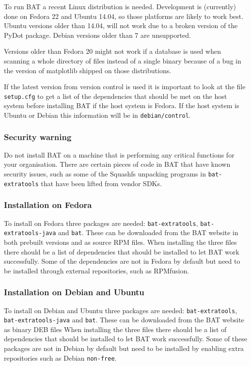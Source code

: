 \documentclass[10pt,a4paper]{article}
\begin{document}
To run BAT a recent Linux distribution is needed. Development is (currently)
done on Fedora 22 and Ubuntu 14.04, so those platforms are likely to
work best. Ubuntu versions older than 14.04, will not work due to a broken
version of the PyDot package. Debian versions older than 7 are unsupported.

Versions older than Fedora 20 might not work if a database is used when
scanning a whole directory of files instead of a single binary because of a bug
in the version of matplotlib shipped on those distributions.

If the latest version from version control is used it is important to look at
the file \texttt{setup.cfg} to get a list of the dependencies that should be
met on the host system before installing BAT if the host system is Fedora. If
the host system is Ubuntu or Debian this information will be in
\texttt{debian/control}.

\subsubsection{Security warning}

Do not install BAT on a machine that is performing any critical functions for
your organisation. There are certain pieces of code in BAT that have known
security issues, such as some of the Squashfs unpacking programs in
\texttt{bat-extratools} that have been lifted from vendor SDKs.

\subsubsection{Installation on Fedora}

To install on Fedora three packages are needed:
\texttt{bat-extratools}, \texttt{bat-extratools-java} %
and \texttt{bat}. These can be downloaded from the BAT website in both prebuilt
versions and as source RPM files. When installing the three files there should
be a list of dependencies that should be installed to let BAT work successfully.
Some of the dependencies are not in Fedora by default but need to be installed
through external repositories, such as RPMfusion.

\subsubsection{Installation on Debian and Ubuntu}

To install on Debian and Ubuntu three packages are needed:
\texttt{bat-extratools}, \texttt{bat-extratools-java} %
and \texttt{bat}. These can be downloaded from the BAT website as binary DEB
files When installing the three files there should be a list of dependencies
that should be installed to let BAT work successfully. Some of these packages
are not in Debian by default but need to be installed by enabling extra
repositories such as Debian \texttt{non-free}.
\end{document}
